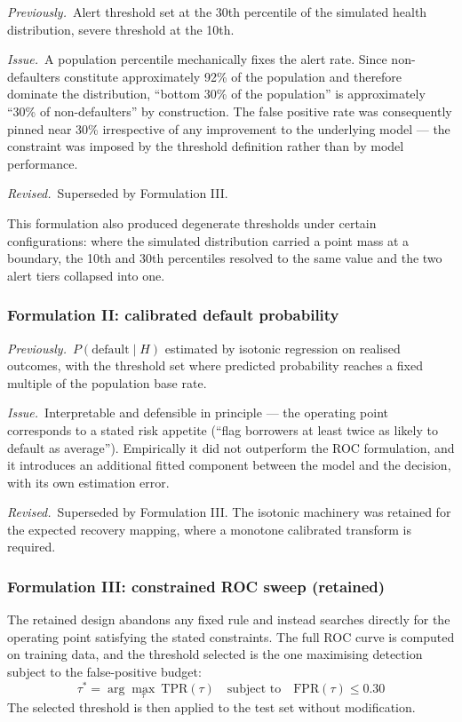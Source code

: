 \documentclass[11pt,a4paper]{article}
\newcommand{\designnote}[3]{%
  \par\vspace{7pt}
  \begin{list}{}{%
    \setlength{\leftmargin}{2em}\setlength{\rightmargin}{1em}%
    \setlength{\labelwidth}{0pt}\setlength{\labelsep}{0pt}%
    \setlength{\itemsep}{2pt}\setlength{\topsep}{0pt}%
    \setlength{\parsep}{0pt}}
    \item[]\textit{Previously.}~#1
    \item[]\textit{Issue.}~#2
    \item[]\textit{Revised.}~#3
  \end{list}
  \par\vspace{7pt}
}
\begin{document}
\designnote{Alert threshold set at the 30th percentile of the simulated health
distribution, severe threshold at the 10th.}
{A population percentile mechanically fixes the alert rate. Since non-defaulters
constitute approximately 92\% of the population and therefore dominate the distribution,
``bottom 30\% of the population'' is approximately ``30\% of non-defaulters'' by
construction. The false positive rate was consequently pinned near 30\% irrespective of
any improvement to the underlying model --- the constraint was imposed by the threshold
definition rather than by model performance.}
{Superseded by Formulation III.}

This formulation also produced degenerate thresholds under certain configurations: where
the simulated distribution carried a point mass at a boundary, the 10th and 30th
percentiles resolved to the same value and the two alert tiers collapsed into one.

\subsubsection*{Formulation II: calibrated default probability}

\designnote{$P(\text{default} \mid H)$ estimated by isotonic regression on realised
outcomes, with the threshold set where predicted probability reaches a fixed multiple of
the population base rate.}
{Interpretable and defensible in principle --- the operating point corresponds to a
stated risk appetite (``flag borrowers at least twice as likely to default as
average''). Empirically it did not outperform the ROC formulation, and it introduces an
additional fitted component between the model and the decision, with its own estimation
error.}
{Superseded by Formulation III. The isotonic machinery was retained for the expected
recovery mapping, where a monotone calibrated transform is required.}

\subsubsection*{Formulation III: constrained ROC sweep (retained)}

The retained design abandons any fixed rule and instead searches directly for the
operating point satisfying the stated constraints. The full ROC curve is computed on
training data, and the threshold selected is the one maximising detection subject to the
false-positive budget:
\begin{equation}
\tau^{*} = \arg\max_{\tau} \ \mathrm{TPR}(\tau)
\quad \text{subject to} \quad \mathrm{FPR}(\tau) \leq 0.30
\end{equation}
The selected threshold is then applied to the test set without modification.
\end{document}
